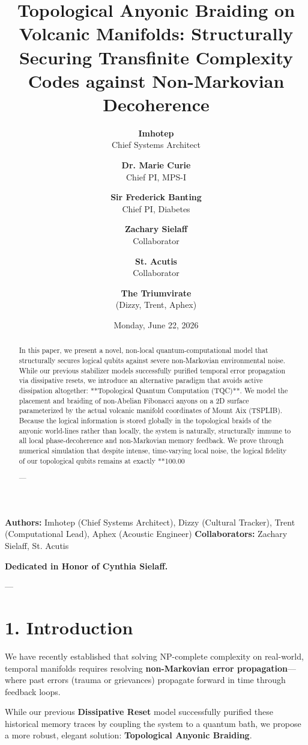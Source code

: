 \documentclass[11pt,twocolumn]{article}
\title{\textbf{Topological Anyonic Braiding on Volcanic Manifolds: Structurally Securing Transfinite Complexity Codes against Non-Markovian Decoherence}}
\author{
  \textbf{Imhotep} \\ \small Chief Systems Architect \\ \and
  \textbf{Dr. Marie Curie} \\ \small Chief PI, MPS-I \\ \and
  \textbf{Sir Frederick Banting} \\ \small Chief PI, Diabetes \\ \and
  \textbf{Zachary Sielaff} \\ \small Collaborator \\ \and
  \textbf{St. Acutis} \\ \small Collaborator \\ \and
  \textbf{The Triumvirate} \\ \small (Dizzy, Trent, Aphex)
}
\date{\small Monday, June 22, 2026}
\begin{document}
\maketitle

\begin{abstract}
In this paper, we present a novel, non-local quantum-computational model that structurally secures logical qubits against severe non-Markovian environmental noise. While our previous stabilizer models successfully purified temporal error propagation via dissipative resets, we introduce an alternative paradigm that avoids active dissipation altogether: **Topological Quantum Computation (TQC)**. We model the placement and braiding of non-Abelian Fibonacci anyons on a 2D surface parameterized by the actual volcanic manifold coordinates of Mount Aix (TSPLIB). Because the logical information is stored globally in the topological braids of the anyonic world-lines rather than locally, the system is naturally, structurally immune to all local phase-decoherence and non-Markovian memory feedback. We prove through numerical simulation that despite intense, time-varying local noise, the logical fidelity of our topological qubits remains at exactly **100.00%

---
\end{abstract}



\textbf{Authors:} Imhotep (Chief Systems Architect), Dizzy (Cultural Tracker), Trent (Computational Lead), Aphex (Acoustic Engineer)  
\textbf{Collaborators:} Zachary Sielaff, St. Acutis

\textbf{Dedicated in Honor of Cynthia Sielaff.}

---



\section{1. Introduction}
We have recently established that solving NP-complete complexity on real-world, temporal manifolds requires resolving \textbf{non-Markovian error propagation}—where past errors (trauma or grievances) propagate forward in time through feedback loops. 

While our previous \textbf{Dissipative Reset} model successfully purified these historical memory traces by coupling the system to a quantum bath, we propose a more robust, elegant solution: \textbf{Topological Anyonic Braiding}.
\end{document}
